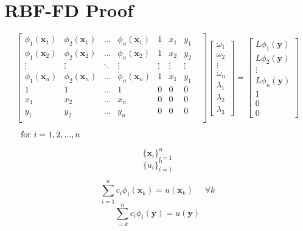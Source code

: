 \documentclass[12pt]{article}
\let\vec\mathbf
\begin{document}
\section{RBF-FD Proof}
$$
\begin{bmatrix}
	\phi_1(\vec{x}_1) & \phi_2(\vec{x}_1) & \dots & \phi_n(\vec{x}_1) & 1 & x_1 & y_1 \\
	\phi_1(\vec{x}_2) & \phi_2(\vec{x}_2) & \dots & \phi_n(\vec{x}_2) & 1 & x_2 & y_2 \\
	\vdots 		& \vdots	& \ddots& \vdots & \vdots& \vdots& \vdots& \\
	\phi_1(\vec{x}_n) & \phi_2(\vec{x}_n) & \dots & \phi_n(\vec{x}_n) & 1 & x_1 & y_1 \\
	1 & 1 & \dots & 1 & 0 & 0 & 0\\
	x_1 & x_2 & \dots & x_n & 0 & 0 & 0\\
	y_1 & y_2 & \dots & y_n & 0 & 0 & 0\\
\end{bmatrix}
\begin{bmatrix}
	\omega_1 \\ \omega_2 \\ \vdots \\ \omega_n \\
	\lambda_1 \\ \lambda_2 \\ \lambda_3
\end{bmatrix}
=
\begin{bmatrix}
	L\phi_1(\vec{y}) \\ L\phi_2(\vec{y}) \\ \vdots \\ L\phi_n(\vec{y}) \\
	1 \\ 0 \\ 0 
\end{bmatrix}
$$

$\text{\phantom{==} for } i=1,2,...,n$

$$
\{\vec{x}_i\}_{i=1}^n
$$
$$
\{u_i\}_{i=1}^n
$$

$$
\sum_{i=1}^n c_i \phi_i(\vec{x}_k) = u(\vec{x}_k) \phantom{=} \forall k
$$
$$
\sum_{=k}^n c_i \phi_i(\vec{y}) = u(\vec{y})
$$
\end{document}
